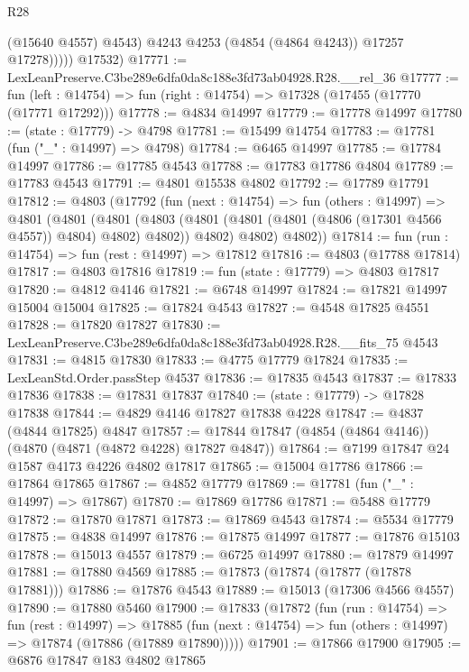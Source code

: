\begin{lexlean}{R28}
\begin{coremodule}
                  (@15640 @4557)
                  @4543)
                @4243
                @4253
                (@4854 (@4864 @4243))
                @17257
                @17278)))))
      @17532)
@17771 := LexLeanPreserve.C3be289e6dfa0da8c188e3fd73ab04928.R28.__rel_36
@17777 := fun (left : @14754) => fun (right : @14754) => @17328 (@17455 (@17770 (@17771 @17292)))
@17778 := @4834 @14997
@17779 := @17778 @14997
@17780 := (state : @17779) -> @4798
@17781 := @15499 @14754
@17783 := @17781 (fun ("_" : @14997) => @4798)
@17784 := @6465 @14997
@17785 := @17784 @14997
@17786 := @17785 @4543
@17788 := @17783 @17786 @4804
@17789 := @17783 @4543
@17791 := @4801 @15538 @4802
@17792 := @17789 @17791
@17812 := @4803
    (@17792
      (fun (next : @14754) =>
      fun (others : @14997) =>
      @4801
        (@4801
          (@4801
            (@4803 (@4801 (@4801 (@4801 (@4806 (@17301 @4566 @4557)) @4804) @4802) @4802))
            @4802)
          @4802)
        @4802))
@17814 := fun (run : @14754) => fun (rest : @14997) => @17812
@17816 := @4803 (@17788 @17814)
@17817 := @4803 @17816
@17819 := fun (state : @17779) => @4803 @17817
@17820 := @4812 @4146
@17821 := @6748 @14997
@17824 := @17821 @14997 @15004 @15004
@17825 := @17824 @4543
@17827 := @4548 @17825 @4551
@17828 := @17820 @17827
@17830 := LexLeanPreserve.C3be289e6dfa0da8c188e3fd73ab04928.R28.__fits_75 @4543
@17831 := @4815 @17830
@17833 := @4775 @17779 @17824
@17835 := LexLeanStd.Order.passStep @4537
@17836 := @17835 @4543
@17837 := @17833 @17836
@17838 := @17831 @17837
@17840 := (state : @17779) -> @17828 @17838
@17844 := @4829 @4146 @17827 @17838 @4228
@17847 := @4837 (@4844 @17825) @4847
@17857 := @17844 @17847 (@4854 (@4864 @4146)) (@4870 (@4871 (@4872 @4228) @17827 @4847))
@17864 := @7199 @17847 @24 @1587 @4173 @4226 @4802 @17817
@17865 := @15004 @17786
@17866 := @17864 @17865
@17867 := @4852 @17779
@17869 := @17781 (fun ("_" : @14997) => @17867)
@17870 := @17869 @17786
@17871 := @5488 @17779
@17872 := @17870 @17871
@17873 := @17869 @4543
@17874 := @5534 @17779
@17875 := @4838 @14997
@17876 := @17875 @14997
@17877 := @17876 @15103
@17878 := @15013 @4557
@17879 := @6725 @14997
@17880 := @17879 @14997
@17881 := @17880 @4569
@17885 := @17873 (@17874 (@17877 (@17878 @17881)))
@17886 := @17876 @4543
@17889 := @15013 (@17306 @4566 @4557)
@17890 := @17880 @5460
@17900 := @17833
    (@17872
      (fun (run : @14754) =>
      fun (rest : @14997) =>
      @17885 (fun (next : @14754) => fun (others : @14997) => @17874 (@17886 (@17889 @17890)))))
@17901 := @17866 @17900
@17905 := @6876 @17847 @183 @4802 @17865

\end{coremodule}
\end{lexlean}
